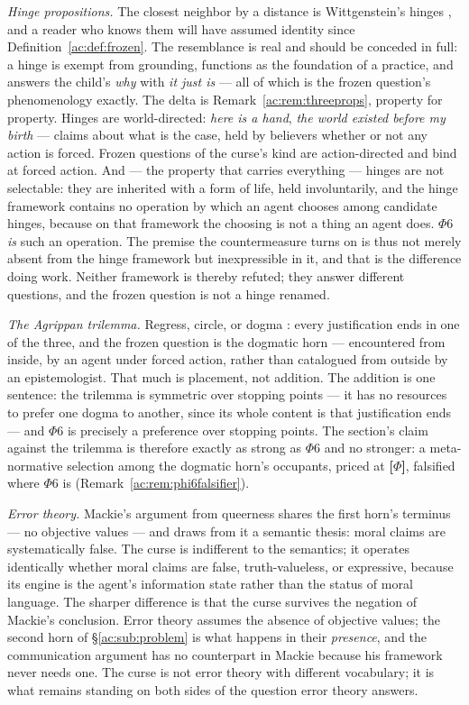 \documentclass[11pt]{article}
\numberwithin{equation}{section}
\theoremstyle{plain}
\theoremstyle{definition}
\theoremstyle{remark}
\begin{document}
\emph{Hinge propositions.} The closest neighbor by a distance is Wittgenstein's hinges \cite{Wittgenstein69}, and a reader who knows them will have assumed identity since Definition~\ref{ac:def:frozen}. The resemblance is real and should be conceded in full: a hinge is exempt from grounding, functions as the foundation of a practice, and answers the child's \emph{why} with \emph{it just is} --- all of which is the frozen question's phenomenology exactly. The delta is Remark~\ref{ac:rem:threeprops}, property for property. Hinges are world-directed: \emph{here is a hand}, \emph{the world existed before my birth} --- claims about what is the case, held by believers whether or not any action is forced. Frozen questions of the curse's kind are action-directed and bind at forced action. And --- the property that carries everything --- hinges are not selectable: they are inherited with a form of life, held involuntarily, and the hinge framework contains no operation by which an agent chooses among candidate hinges, because on that framework the choosing is not a thing an agent does. $\Phi6$ \emph{is} such an operation. The premise the countermeasure turns on is thus not merely absent from the hinge framework but inexpressible in it, and that is the difference doing work. Neither framework is thereby refuted; they answer different questions, and the frozen question is not a hinge renamed.

\emph{The Agrippan trilemma.} Regress, circle, or dogma \cite{Sextus}: every justification ends in one of the three, and the frozen question is the dogmatic horn --- encountered from inside, by an agent under forced action, rather than catalogued from outside by an epistemologist. That much is placement, not addition. The addition is one sentence: the trilemma is symmetric over stopping points --- it has no resources to prefer one dogma to another, since its whole content is that justification ends --- and $\Phi6$ is precisely a preference over stopping points. The section's claim against the trilemma is therefore exactly as strong as $\Phi6$ and no stronger: a meta-normative selection among the dogmatic horn's occupants, priced at \textbf{[$\Phi$]}, falsified where $\Phi6$ is (Remark~\ref{ac:rem:phi6falsifier}).

\emph{Error theory.} Mackie's argument from queerness \cite{Mackie77} shares the first horn's terminus --- no objective values --- and draws from it a semantic thesis: moral claims are systematically false. The curse is indifferent to the semantics; it operates identically whether moral claims are false, truth-valueless, or expressive, because its engine is the agent's information state rather than the status of moral language. The sharper difference is that the curse survives the negation of Mackie's conclusion. Error theory assumes the absence of objective values; the second horn of \S\ref{ac:sub:problem} is what happens in their \emph{presence}, and the communication argument has no counterpart in Mackie because his framework never needs one. The curse is not error theory with different vocabulary; it is what remains standing on both sides of the question error theory answers.
\end{document}
